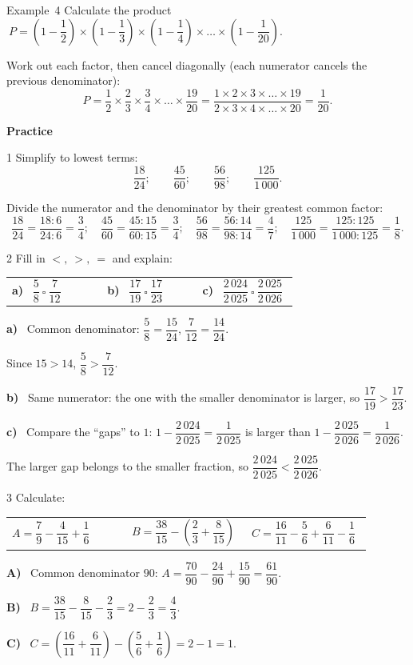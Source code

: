 \documentclass[11pt]{article}
\makeatletter
\newif\ifsol \solfalse
\renewcommand{\arraystretch}{1.35}
\newcommand{\guide}{\par\vspace{4pt}{\bfseries\color{tmBlue}\GuideWord}\par\vspace{3pt}\nopagebreak}
\newcommand{\probsol}[1]{%
  \begin{lrbox}{\solmeasure}\begin{minipage}{\dimexpr\linewidth-24pt\relax}#1\end{minipage}\end{lrbox}%
  \ifsol
    \begin{solbox}#1\end{solbox}%
  \else
    \setlength{\solht}{\dimexpr\ht\solmeasure+\dp\solmeasure+0.85cm\relax}%
    \ifdim\solht<1.35cm\setlength{\solht}{1.35cm}\fi
    \begin{tcolorbox}[colback=white,colframe=Line,boxrule=0.8pt,arc=5pt,
      left=8pt,right=8pt,top=4pt,bottom=4pt,height=\solht]{\footnotesize\color{Slate}\itshape\WorkWord}\end{tcolorbox}%
  \fi}
\newcommand{\dividerbar}[1]{\par\vspace{0.6em}\noindent
  \begin{tcolorbox}[enhanced,frame hidden,interior hidden,borderline west={5pt}{0pt}{ProbBlue},
    colback=white,left=12pt,right=12pt,top=5pt,bottom=5pt,arc=4pt]
  {\large\bfseries\color{ProbBlue} #1}\end{tcolorbox}\vspace{0.4em}}
\newcommand{\pa}[1]{\textbf{#1)}\ }
\newenvironment{cols3}{\par\vspace{3pt}\noindent\setlength{\tabcolsep}{0pt}\renewcommand{\arraystretch}{1.3}%
  \begin{tabular}{@{}>{\raggedright\arraybackslash\rule{0pt}{4.4ex}}p{0.32\linewidth}<{\rule[-2.3ex]{0pt}{0pt}}@{\hspace{0.015\linewidth}}>{\raggedright\arraybackslash\rule{0pt}{4.4ex}}p{0.32\linewidth}<{\rule[-2.3ex]{0pt}{0pt}}@{\hspace{0.015\linewidth}}>{\raggedright\arraybackslash\rule{0pt}{4.4ex}}p{0.32\linewidth}<{\rule[-2.3ex]{0pt}{0pt}}@{}}}%
  {\end{tabular}\par}
\newcommand{\gap}{\vspace{0.3cm}}
\def\GuideWord{Guided solution.}
\def\WorkWord{Your work:}
\def\ExWord{Example}
\makeatother
\begin{document}
\gap
\begin{exbox}{\ExWord\ 4}
Calculate the product $\ P=\left(1-\dfrac12\right)\times\left(1-\dfrac13\right)\times\left(1-\dfrac14\right)\times\dots\times\left(1-\dfrac1{20}\right)$.
\guide
Work out each factor, then cancel diagonally (each numerator cancels the previous denominator):
\[P=\frac12\times\frac23\times\frac34\times\dots\times\frac{19}{20}=\frac{1\times2\times3\times\dots\times19}{2\times3\times4\times\dots\times20}=\frac1{20}.\]
\end{exbox}
\dividerbar{Practice}
\begin{probbox}{1}{\relax}
Simplify to lowest terms:
\[\frac{18}{24};\qquad\frac{45}{60};\qquad\frac{56}{98};\qquad\frac{125}{1\,000}.\]
\end{probbox}
\probsol{
Divide the numerator and the denominator by their greatest common factor:
\[\frac{18}{24}=\frac{18:6}{24:6}=\frac34;\quad\frac{45}{60}=\frac{45:15}{60:15}=\frac34;\quad\frac{56}{98}=\frac{56:14}{98:14}=\frac47;\quad\frac{125}{1\,000}=\frac{125:125}{1\,000:125}=\frac18.\]
}
\gap
\begin{probbox}{2}{\relax}
Fill in $<,\ >,\ =$ and explain:
\begin{cols3}
\pa{a} $\dfrac58\ \square\ \dfrac7{12}$ & \pa{b} $\dfrac{17}{19}\ \square\ \dfrac{17}{23}$ & \pa{c} $\dfrac{2\,024}{2\,025}\ \square\ \dfrac{2\,025}{2\,026}$
\end{cols3}
\end{probbox}
\probsol{
\pa{a} Common denominator: $\dfrac58=\dfrac{15}{24}$, $\dfrac7{12}=\dfrac{14}{24}$.\par Since $15>14$, $\dfrac58>\dfrac7{12}$.\par
\pa{b} Same numerator: the one with the smaller denominator is larger, so $\dfrac{17}{19}>\dfrac{17}{23}$.\par
\pa{c} Compare the ``gaps'' to $1$: $1-\dfrac{2\,024}{2\,025}=\dfrac1{2\,025}$ is larger than $1-\dfrac{2\,025}{2\,026}=\dfrac1{2\,026}$.\par The larger gap belongs to the smaller fraction, so $\dfrac{2\,024}{2\,025}<\dfrac{2\,025}{2\,026}$.
}
\gap
\begin{probbox}{3}{\relax}
Calculate:
\begin{cols3}
$A=\dfrac79-\dfrac4{15}+\dfrac16$ & $B=\dfrac{38}{15}-\left(\dfrac23+\dfrac8{15}\right)$ & $C=\dfrac{16}{11}-\dfrac56+\dfrac6{11}-\dfrac16$
\end{cols3}
\end{probbox}
\probsol{
\pa{A} Common denominator $90$: $A=\dfrac{70}{90}-\dfrac{24}{90}+\dfrac{15}{90}=\dfrac{61}{90}$.\par
\pa{B} $B=\dfrac{38}{15}-\dfrac8{15}-\dfrac23=2-\dfrac23=\dfrac43$.\par
\pa{C} $C=\left(\dfrac{16}{11}+\dfrac6{11}\right)-\left(\dfrac56+\dfrac16\right)=2-1=1$.
}
\end{document}
